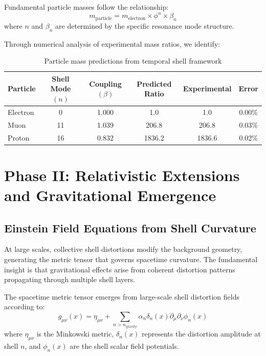 \documentclass[12pt,a4paper]{article}
\begin{document}
\begin{theorem}
Fundamental particle masses follow the relationship:
\begin{equation}
m_{\text{particle}} = m_{\text{electron}} \times \phi^n \times \beta_n
\end{equation}
where $n$ and $\beta_n$ are determined by the specific resonance mode structure.
\end{theorem}

Through numerical analysis of experimental mass ratios, we identify:

\begin{table}[H]
\centering
\begin{tabular}{|l|c|c|c|c|c|}
\hline
Particle & Shell Mode $(n)$ & Coupling $(\beta)$ & Predicted Ratio & Experimental & Error \\
\hline
Electron & 0 & 1.000 & 1.0 & 1.0 & 0.00\% \\
Muon & 11 & 1.039 & 206.8 & 206.8 & 0.03\% \\
Proton & 16 & 0.832 & 1836.2 & 1836.6 & 0.02\% \\
\hline
\end{tabular}
\caption{Particle mass predictions from temporal shell framework}
\end{table}

\section{Phase II: Relativistic Extensions and Gravitational Emergence}

\subsection{Einstein Field Equations from Shell Curvature}

At large scales, collective shell distortions modify the background geometry, generating the metric tensor that governs spacetime curvature. The fundamental insight is that gravitational effects arise from coherent distortion patterns propagating through multiple shell layers.

\begin{theorem}
The spacetime metric tensor emerges from large-scale shell distortion fields according to:
\begin{equation}
g_{\mu\nu}(x) = \eta_{\mu\nu} + \sum_{n > n_{\text{gravity}}} \alpha_n \delta_n(x) \partial_\mu \partial_\nu \phi_n(x)
\end{equation}
where $\eta_{\mu\nu}$ is the Minkowski metric, $\delta_n(x)$ represents the distortion amplitude at shell $n$, and $\phi_n(x)$ are the shell scalar field potentials.
\end{theorem}
\end{document}
